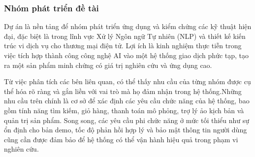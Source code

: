 \subsubsection{Nhóm phát triển đề tài}

Dự án là nền tảng để nhóm phát triển ứng dụng và kiểm chứng các kỹ thuật hiện đại, đặc biệt là trong lĩnh vực Xử lý Ngôn ngữ Tự nhiên (NLP) và thiết kế kiến trúc vi dịch vụ cho thương mại điện tử. Lợi ích là kinh nghiệm thực tiễn trong việc tích hợp thành công công nghệ AI vào một hệ thống giao dịch phức tạp, tạo ra một sản phẩm minh chứng có giá trị nghiên cứu và ứng dụng cao.

Từ việc phân tích các bên liên quan, có thể thấy nhu cầu của từng nhóm được cụ thể hóa rõ ràng và gắn liền với vai trò mà họ đảm nhận trong hệ thống.Những nhu cầu trên chính là cơ sở để xác định các yêu cầu chức năng của hệ thống, bao gồm tính năng tìm kiếm, giỏ hàng, thanh toán mô phỏng, trợ lý ảo kịch bản và quản trị sản phẩm. Song song, các yêu cầu phi chức năng ở mức tối thiểu như sự ổn định cho bản demo, tốc độ phản hồi hợp lý và bảo mật thông tin người dùng cũng cần được đảm bảo để hệ thống có thể vận hành hiệu quả trong phạm vi nghiên cứu.